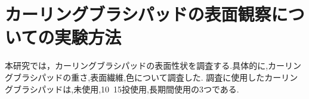 \documentclass[main]{subfiles}
\begin{document}
\chapter{カーリングブラシパッドの表面観察についての実験方法}
本研究では，カーリングブラシパッドの表面性状を調査する.具体的に,カーリングブラシパッドの重さ,表面繊維,色について調査した.
調査に使用したカーリングブラシパッドは,未使用,10~15投使用,長期間使用の3つである.
\end{document}
